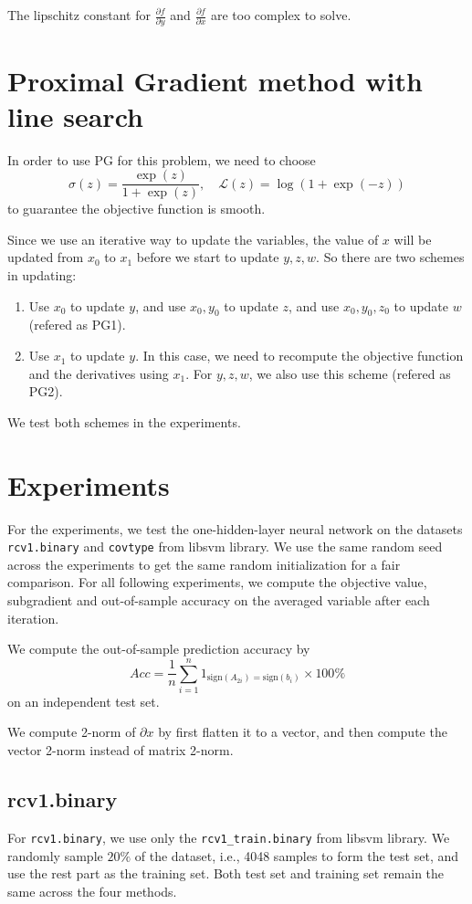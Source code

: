 \documentclass{article}
\numberwithin{equation}{section}
\numberwithin{figure}{section}
\begin{document}
The lipschitz constant for $\frac{\partial f}{\partial y}$ and $\frac{\partial f}{\partial x}$ are too complex to solve. 

\section{Proximal Gradient method with line search}
In order to use PG for this problem, we need to choose 
\begin{equation}
\sigma(z) = \frac{\exp(z)}{1+\exp(z)}, \quad \mathcal{L}(z) = \log(1+\exp(-z))
\end{equation}
to guarantee the objective function is smooth.

Since we use an iterative way to update the variables, the value of $x$ will be updated from $x_0 $ to $x_1 $ before we start to update $y, z, w$. So there are two schemes in updating:
\begin{enumerate}
\item Use $x_0 $ to update $y$, and use $x_0, y_0 $ to update $z$, and use $x_0, y_0, z_0 $ to update $w$ (refered as PG1).
\item Use $x_1 $ to update $y$. In this case, we need to recompute the objective function and the derivatives using $ x_1 $. For $y, z, w$, we also use this scheme (refered as PG2).
\end{enumerate}
We test both schemes in the experiments.

\section{Experiments}
For the experiments, we test the one-hidden-layer neural network on the datasets \texttt{rcv1.binary} and \texttt{covtype} from libsvm library. We use the same random seed across the experiments to get the same random initialization for a fair comparison. For all following experiments, we compute the objective value, subgradient and out-of-sample accuracy on the averaged variable after each iteration.

We compute the out-of-sample prediction accuracy by
\begin{equation}
Acc = \frac{1}{n}\sum_{i=1}^{n} 1_{\text{sign}(A_{2i}) = \text{sign}(b_i)} \times 100\%
\end{equation}
on an independent test set.

We compute 2-norm of $\partial x$ by first flatten it to a vector, and then compute the vector 2-norm instead of matrix 2-norm. 

\subsection{rcv1.binary}
For \texttt{rcv1.binary}, we use only the \texttt{rcv1\_train.binary} from libsvm library. We randomly sample $20\%$ of the dataset, i.e., 4048 samples to form the test set, and use the rest part as the training set. Both test set and training set remain the same across the four methods.
\end{document}
